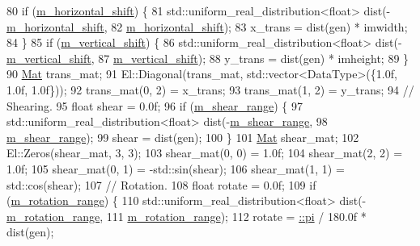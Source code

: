 \begin{DoxyCode}
80     \textcolor{keywordflow}{if} (\hyperlink{classlbann_1_1lbann__image__preprocessor_a636f59ffe470f996677601df6179bc41}{m\_horizontal\_shift}) \{
81       std::uniform\_real\_distribution<float> dist(-\hyperlink{classlbann_1_1lbann__image__preprocessor_a636f59ffe470f996677601df6179bc41}{m\_horizontal\_shift},
82           \hyperlink{classlbann_1_1lbann__image__preprocessor_a636f59ffe470f996677601df6179bc41}{m\_horizontal\_shift});
83       x\_trans = dist(gen) * imwidth;
84     \}
85     \textcolor{keywordflow}{if} (\hyperlink{classlbann_1_1lbann__image__preprocessor_a06158637d634a4d123ee5501ddd0c7cb}{m\_vertical\_shift}) \{
86       std::uniform\_real\_distribution<float> dist(-\hyperlink{classlbann_1_1lbann__image__preprocessor_a06158637d634a4d123ee5501ddd0c7cb}{m\_vertical\_shift},
87           \hyperlink{classlbann_1_1lbann__image__preprocessor_a06158637d634a4d123ee5501ddd0c7cb}{m\_vertical\_shift});
88       y\_trans = dist(gen) * imheight;
89     \}
90     \hyperlink{base_8hpp_a68f11fdc31b62516cb310831bbe54d73}{Mat} trans\_mat;
91     El::Diagonal(trans\_mat, std::vector<DataType>(\{1.0f, 1.0f, 1.0f\}));
92     trans\_mat(0, 2) = x\_trans;
93     trans\_mat(1, 2) = y\_trans;
94     \textcolor{comment}{// Shearing.}
95     \textcolor{keywordtype}{float} shear = 0.0f;
96     \textcolor{keywordflow}{if} (\hyperlink{classlbann_1_1lbann__image__preprocessor_a237ead6488b2c04e982fd10510ae03b4}{m\_shear\_range}) \{
97       std::uniform\_real\_distribution<float> dist(-\hyperlink{classlbann_1_1lbann__image__preprocessor_a237ead6488b2c04e982fd10510ae03b4}{m\_shear\_range},
98           \hyperlink{classlbann_1_1lbann__image__preprocessor_a237ead6488b2c04e982fd10510ae03b4}{m\_shear\_range});
99       shear = dist(gen);
100     \}
101     \hyperlink{base_8hpp_a68f11fdc31b62516cb310831bbe54d73}{Mat} shear\_mat;
102     El::Zeros(shear\_mat, 3, 3);
103     shear\_mat(0, 0) = 1.0f;
104     shear\_mat(2, 2) = 1.0f;
105     shear\_mat(0, 1) = -std::sin(shear);
106     shear\_mat(1, 1) = std::cos(shear);
107     \textcolor{comment}{// Rotation.}
108     \textcolor{keywordtype}{float} rotate = 0.0f;
109     \textcolor{keywordflow}{if} (\hyperlink{classlbann_1_1lbann__image__preprocessor_a7518ae40fe38862c831832fdaf948d45}{m\_rotation\_range}) \{
110       std::uniform\_real\_distribution<float> dist(-\hyperlink{classlbann_1_1lbann__image__preprocessor_a7518ae40fe38862c831832fdaf948d45}{m\_rotation\_range},
111           \hyperlink{classlbann_1_1lbann__image__preprocessor_a7518ae40fe38862c831832fdaf948d45}{m\_rotation\_range});
112       rotate = \hyperlink{namespaceanonymous__namespace_02image__preprocessor_8cpp_03_a9624405339d16214b745f28f39979c6d}{::pi} / 180.0f * dist(gen);

\end{DoxyCode}
